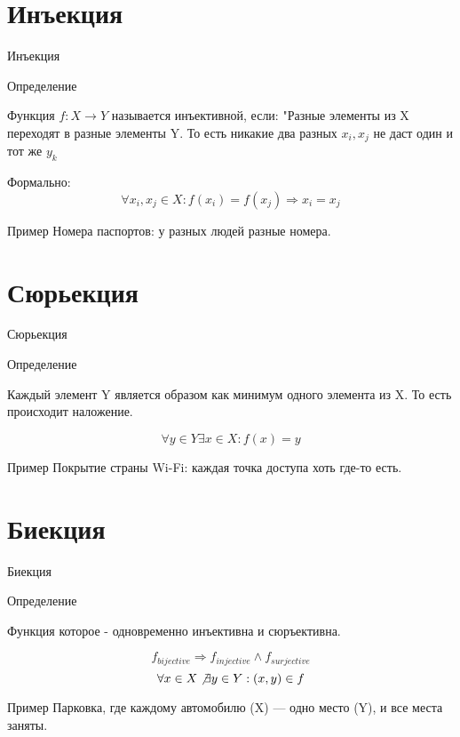 \documentclass{beamer}
\newenvironment{rusdefinition}[1][Определение]{
    \begin{block}{#1}
}{\end{block}}
\newenvironment{rexample}[1][Пример]{\begin{exampleblock}{#1}}{\end{exampleblock}}
\begin{document}
\section{Инъекция}
\begin{frame}{Инъекция}
\begin{rusdefinition}
    Функция $f : X \rightarrow Y $ называется инъективной, если:
    "Разные элементы из X переходят в разные элементы Y.
    То есть никакие два разных $x_i, x_j$ не даст один и тот же $y_k$
\end{rusdefinition}
    Формально: 
    \[ \forall x_i, x_j \in X \colon f(x_i) = f(x_j) \Rightarrow x_i = x_j \]
    \begin{rexample}
    Номера паспортов: у разных людей разные номера.
\end{rexample}
\end{frame}

\section{Сюрьекция}
\begin{frame}{Сюрьекция}
    \begin{rusdefinition}
        Каждый элемент Y является образом как минимум одного элемента из X.
        То есть происходит наложение. 
    \end{rusdefinition}
\[ \forall y \in Y \exists x \in X \colon f(x) = y \]
\begin{rexample}
Покрытие страны Wi-Fi: каждая точка доступа хоть где-то есть.
\end{rexample}
\end{frame}

\section{Биекция}

\begin{frame}{Биекция}
    \begin{rusdefinition}
        Функция которое - одновременно инъективна и сюръективна.
    \end{rusdefinition}
    \[ f_{bijective} \Rightarrow f_{injective} \land f_{surjective} \]
    \[ \forall x \in X \not\exists y \in Y : (x,y) \in f \]
    \begin{rexample}
    Парковка, где каждому автомобилю (X) — одно место (Y), и все места заняты.
    \end{rexample}
\end{frame}
\end{document}
